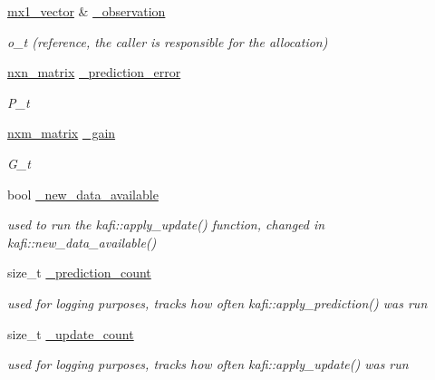 \begin{DoxyCompactItemize}
\mbox{\label{classkafi_1_1kafi_acd1957b1eef474dab5ddb3122b833f56}} 
\hyperlink{classkafi_1_1kafi_a3a6f412f435a9e1f81178f36965822c3}{mx1\+\_\+vector} \& \hyperlink{classkafi_1_1kafi_acd1957b1eef474dab5ddb3122b833f56}{\+\_\+observation}
\begin{DoxyCompactList}\small\item\em {\ttfamily o\+\_\+t} (reference, the caller is responsible for the allocation) \end{DoxyCompactList}\item 
\mbox{\label{classkafi_1_1kafi_abcaf040c76f04e76cd3759ef292aacca}} 
\hyperlink{classkafi_1_1kafi_a771d8045a61e16033e4a644675b5f4e7}{nxn\+\_\+matrix} \hyperlink{classkafi_1_1kafi_abcaf040c76f04e76cd3759ef292aacca}{\+\_\+prediction\+\_\+error}
\begin{DoxyCompactList}\small\item\em {\ttfamily P\+\_\+t} \end{DoxyCompactList}\item 
\mbox{\label{classkafi_1_1kafi_af88dd9bf341987b55a6c3cb67bc274d2}} 
\hyperlink{classkafi_1_1kafi_a637e94a4aa607b8c62ca61fb3d986430}{nxm\+\_\+matrix} \hyperlink{classkafi_1_1kafi_af88dd9bf341987b55a6c3cb67bc274d2}{\+\_\+gain}
\begin{DoxyCompactList}\small\item\em {\ttfamily G\+\_\+t} \end{DoxyCompactList}\item 
\mbox{\label{classkafi_1_1kafi_a71ea198e7fb5f0b39d194fdc9dd5ab87}} 
bool \hyperlink{classkafi_1_1kafi_a71ea198e7fb5f0b39d194fdc9dd5ab87}{\+\_\+new\+\_\+data\+\_\+available}
\begin{DoxyCompactList}\small\item\em used to run the kafi\+::apply\+\_\+update() function, changed in kafi\+::new\+\_\+data\+\_\+available() \end{DoxyCompactList}\item 
\mbox{\label{classkafi_1_1kafi_a81c9924f127a060411250ce2c2bc5daa}} 
size\+\_\+t \hyperlink{classkafi_1_1kafi_a81c9924f127a060411250ce2c2bc5daa}{\+\_\+prediction\+\_\+count}
\begin{DoxyCompactList}\small\item\em used for logging purposes, tracks how often kafi\+::apply\+\_\+prediction() was run \end{DoxyCompactList}\item 
\mbox{\label{classkafi_1_1kafi_a8815ba7f3fb319d6ac58386096d3313f}} 
size\+\_\+t \hyperlink{classkafi_1_1kafi_a8815ba7f3fb319d6ac58386096d3313f}{\+\_\+update\+\_\+count}
\begin{DoxyCompactList}\small\item\em used for logging purposes, tracks how often kafi\+::apply\+\_\+update() was run \end{DoxyCompactList}\end{DoxyCompactItemize}
